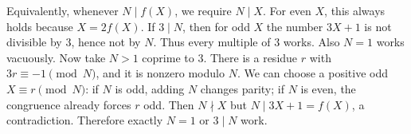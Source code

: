 Equivalently, whenever $N\mid f(X)$, we require $N\mid X$. For even $X$, this always holds because $X=2f(X)$. If $3\mid N$, then for odd $X$ the number $3X+1$ is not divisible by $3$, hence not by $N$. Thus every multiple of $3$ works. Also $N=1$ works vacuously.
Now take $N>1$ coprime to $3$. There is a residue $r$ with $3r\equiv-1\pmod N$, and it is nonzero modulo $N$. We can choose a positive odd $X\equiv r\pmod N$: if $N$ is odd, adding $N$ changes parity; if $N$ is even, the congruence already forces $r$ odd. Then $N\nmid X$ but $N\mid3X+1=f(X)$, a contradiction. Therefore exactly $\boxed{N=1\text{ or }3\mid N}$ work.
